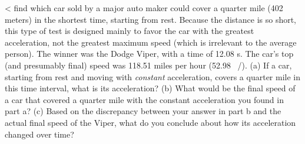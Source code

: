  <%
find which car sold by a major auto maker could cover a
quarter mile (402 meters) in the shortest time, starting
from rest. Because the distance is so short, this type of
test is designed mainly to favor the car with the greatest
acceleration, not the greatest maximum speed (which is
irrelevant to the average person). The winner was the Dodge
Viper, with a time of 12.08 s. The car's top (and
presumably final) speed was 118.51 miles per hour (52.98
\ \munit/\sunit). (a) If a car, starting from rest and moving with
\emph{constant} acceleration, covers a quarter mile in this
time interval, what is its acceleration? (b) What would be
the final speed of a car that covered a quarter mile with
the constant acceleration you found in part a? (c) Based on
the discrepancy between your answer in part b and the
actual final speed of the Viper, what do you conclude about
how its acceleration changed over time?
